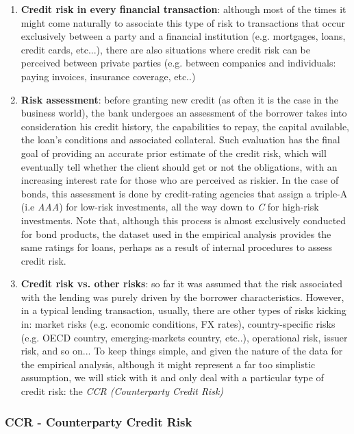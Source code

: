 \documentclass[a4paper,12pt]{article}
\begin{document}
        \begin{enumerate}
            \item \textbf{Credit risk in every financial transaction}: although most of the times it might come naturally to associate this type of risk to transactions that occur exclusively between a party and a financial institution (e.g. mortgages, loans, credit cards, etc...), there are also situations where credit risk can be perceived between private parties (e.g. between companies and individuals: paying invoices, insurance coverage, etc..)  
            \item \textbf{Risk assessment}: before granting new credit (as often it is the case in the business world), the bank undergoes an assessment of the borrower takes into consideration his credit history, the capabilities to repay, the capital available, the loan's conditions and associated collateral. Such evaluation has the final goal of providing an accurate prior estimate of the credit risk, which will eventually tell whether the client should get or not the obligations, with an increasing interest rate for those who are perceived as riskier. In the case of bonds, this assessment is done by credit-rating agencies that assign a triple-A (i.e \textit{AAA}) for low-risk investments, all the way down to \textit{C} for high-risk investments. Note that, although this process is almost exclusively conducted for bond products, the dataset used in the empirical analysis provides the same ratings for loans, perhaps as a result of internal procedures to assess credit risk.
            \item \textbf{Credit risk vs. other risks}: so far it was assumed that the risk associated with the lending was purely driven by the borrower characteristics. However, in a typical lending transaction, usually, there are other types of risks kicking in: market risks (e.g. economic conditions, FX rates), country-specific risks (e.g. OECD country, emerging-markets country, etc..), operational risk, issuer risk, and so on... To keep things simple, and given the nature of the data for the empirical analysis, although it might represent a far too simplistic assumption, we will stick with it and only deal with a particular type of credit risk: the \textit{CCR (Counterparty Credit Risk)}       
        \end{enumerate}
        
    \subsubsection{CCR - Counterparty Credit Risk}
\end{document}
